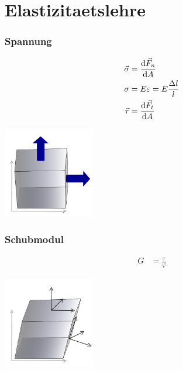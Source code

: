 \newpage
\section{Elastizitaetslehre}

\begin{multicols}{2}{}
\subsubsection{Spannung}
\begin{align*}
\vec{\sigma}&=\frac{\mathop{}\!\mathrm{d}\vec{F}_n}{\mathop{}\!\mathrm{d} A}\\
\sigma&=E \varepsilon=E\frac{\Delta l}{l}\\
\vec{\tau}&= \frac{\mathop{}\!\mathrm{d}\vec{F}_t}{\mathop{}\!\mathrm{d} A}
\end{align*}
\hfill

\begin{center}
 \includegraphics[width=40mm,height=40mm,keepaspectratio=true]{./Physik/Bilder/Spannung.png}
\end{center}
\end{multicols}


\subsubsection{Schubmodul}

\begin{multicols}{2}{}
\begin{align*}
G&=\frac{\tau}{\varphi}
\end{align*}
\hfill

\begin{center}
 \includegraphics[width=40mm,height=40mm,keepaspectratio=true]{./Physik/Bilder/Tangentialspannung.png}
\end{center}
\end{multicols}


